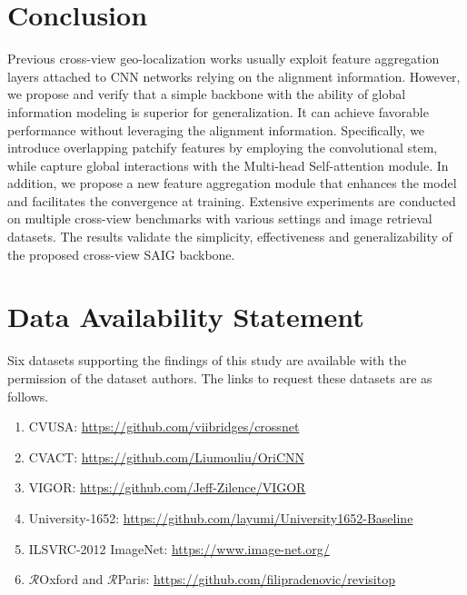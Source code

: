 \documentclass[sn-basic,iicol]{sn-jnl}
\theoremstyle{thmstyletwo}\newtheorem{example}{Example}\newtheorem{remark}{Remark}
\theoremstyle{thmstylethree}\newtheorem{definition}{Definition}
\begin{document}
\section{Conclusion}
Previous cross-view geo-localization works usually exploit feature aggregation layers attached to CNN networks relying on the alignment information. However, we propose and verify that a simple backbone with the ability of global information modeling is superior for generalization. It can achieve favorable performance without leveraging the alignment information. Specifically, we introduce overlapping patchify features by employing the convolutional stem, while capture global interactions with the Multi-head Self-attention module. In addition, we propose a new feature aggregation module that enhances the model and facilitates the convergence at training. Extensive experiments are conducted on multiple cross-view benchmarks with various settings and image retrieval datasets. The results validate the simplicity, effectiveness and generalizability of the proposed cross-view SAIG backbone.




\section*{Data Availability Statement}
Six datasets supporting the findings of this study are available with the permission of the dataset authors. The links to request these datasets are as follows.
\begin{enumerate}[(1)]
\item CVUSA: \href{https://github.com/viibridges/crossnet}{https://github.com/viibridges/crossnet}
\item CVACT: \href{https://github.com/Liumouliu/OriCNN}{https://github.com/Liumouliu/OriCNN}
\item VIGOR: \href{https://github.com/Jeff-Zilence/VIGOR}{https://github.com/Jeff-Zilence/VIGOR}
\item University-1652: \href{https://github.com/layumi/University1652-Baseline}{https://github.com/layumi/University1652-Baseline}
\item ILSVRC-2012 ImageNet: \href{https://www.image-net.org/}{https://www.image-net.org/}
\item $\mathcal{R}$Oxford and $\mathcal{R}$Paris: \href{https://github.com/filipradenovic/revisitop}{https://github.com/filipradenovic/revisitop}
\end{enumerate}






\end{document}
